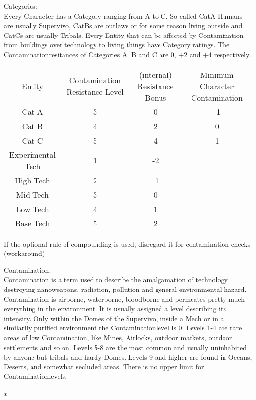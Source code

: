 \documentclass{article}
\begin{document}
    Categories:\\
    Every Character has a Category ranging from A to C. So called CatA Humans are usually Supervivo, CatBs are outlaws or
    for some reason living outside and CatCs are usually Tribals.
    Every Entity that can be affected by Contamination from buildings over technology to living things have Category ratings.
    The Contaminationresitances of Categories A, B and C are 0, +2 and +4 respectively.\\\newline
    \begin{tabular}{c|ccc}
        Entity & Contamination Resistance Level & (internal) Resistance Bonus & Minimum Character Contamination\\
        Cat A & 3 & 0 & -1\\
        Cat B & 4 & 2 & 0\\
        Cat C & 5 & 4 & 1\\
        Experimental Tech & 1 & -2 \\
        High Tech & 2 & -1 \\
        Mid Tech & 3 & 0\\
        Low Tech & 4 & 1 \\
        Base Tech & 5 & 2 \\
    \end{tabular}\newline\newline
    If the optional rule of compounding is used, disregard it for contamination checks (workaround)\\\newline

    Contamination: \\
    Contamination is a term used to describe the amalgamation of technology destroying nanoweapons, radiation, pollution
    and general environmental hazard. Contamination is airborne, waterborne, bloodborne and permeates pretty much
    everything in the environment. It is usually assigned a level describing its intensity. Only within the Domes
    of the Supervivo, inside a Mech or in a similarily purified environment the Contaminationlevel is 0. Levels 1-4 are
    rare areas of low Contamination, like Mines, Airlocks, outdoor markets, outdoor settlements and so on. Levels 5-8
    are the most common and usually uninhabited by anyone but tribals and hardy Domes. Levels 9 and higher are found in
    Oceans, Deserts, and somewhat secluded areas. There is no upper limit for Contaminationlevels. \\\\*
\end{document}
